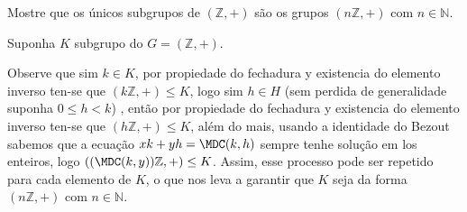 \begin{homeworkProblem}
  Mostre que os únicos subgrupos de $(\mathbb{Z},+)$ são os grupos $(n\mathbb{Z},+)$ com $n\in\mathbb{N}$.
  \begin{solution}
    Suponha $K$ subgrupo do $G=(\mathbb{Z},+)$.

    Observe que sim $k\in K$, por propiedade do fechadura y existencia do elemento inverso ten-se que $(k\mathbb{Z},+)\leq K$, logo sim $h\in H$ (sem perdida de generalidade suponha $0\leq h<k$) , então por propiedade do fechadura y existencia do elemento inverso ten-se que $(h\mathbb{Z},+)\leq K$, além do mais, usando a identidade do Bezout sabemos que a ecuação $xk+yh=\MDC(k,h)$ sempre tenhe solução em los enteiros, logo $\left( (\MDC(k,y))\mathbb{Z},+ \right)\leq K$. Assim, esse processo pode ser repetido para cada elemento de $K$, o que nos leva a garantir que $K$ seja da forma $(n\mathbb{Z},+)$ com $n\in \mathbb{N}$. 
  \end{solution}
\end{homeworkProblem}
